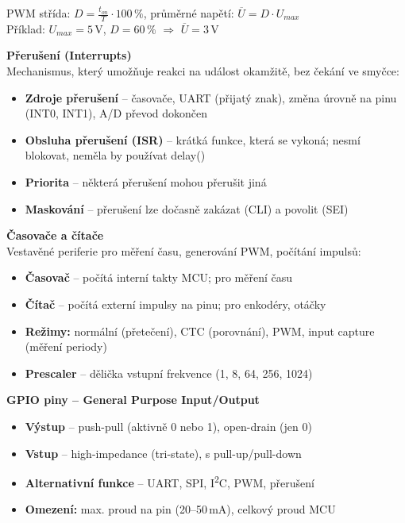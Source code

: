 \documentclass[a4paper,10pt]{article}
\begin{document}
\begin{vysvetlenibox}
\begin{vzorcebox}
PWM střída: $D = \frac{t_{on}}{T} \cdot 100\,\%$, \quad
průměrné napětí: $\overline{U} = D \cdot U_{max}$\\
Příklad: $U_{max}=5\,\text{V}$, $D=60\,\%$ $\Rightarrow$ $\overline{U}=3\,\text{V}$
\end{vzorcebox}

\textbf{Přerušení (Interrupts)}\\
Mechanismus, který umožňuje reakci na událost okamžitě, bez čekání ve smyčce:
\begin{itemize}[noitemsep, leftmargin=1.4em, topsep=4pt]
    \item \textbf{Zdroje přerušení} -- časovače, UART (přijatý znak),
          změna úrovně na pinu (INT0, INT1), A/D převod dokončen
    \item \textbf{Obsluha přerušení (ISR)} -- krátká funkce, která se vykoná;
          nesmí blokovat, neměla by používat delay()
    \item \textbf{Priorita} -- některá přerušení mohou přerušit jiná
    \item \textbf{Maskování} -- přerušení lze dočasně zakázat (CLI) a povolit (SEI)
\end{itemize}

\textbf{Časovače a čítače}\\
Vestavěné periferie pro měření času, generování PWM, počítání impulsů:
\begin{itemize}[noitemsep, leftmargin=1.4em, topsep=4pt]
    \item \textbf{Časovač} -- počítá interní takty MCU; pro měření času
    \item \textbf{Čítač} -- počítá externí impulsy na pinu; pro enkodéry, otáčky
    \item \textbf{Režimy:} normální (přetečení), CTC (porovnání), PWM,
          input capture (měření periody)
    \item \textbf{Prescaler} -- dělička vstupní frekvence (1, 8, 64, 256, 1024)
\end{itemize}

\textbf{GPIO piny -- General Purpose Input/Output}
\begin{itemize}[noitemsep, leftmargin=1.4em, topsep=4pt]
    \item \textbf{Výstup} -- push-pull (aktivně 0 nebo 1), open-drain (jen 0)
    \item \textbf{Vstup} -- high-impedance (tri-state), s pull-up/pull-down
    \item \textbf{Alternativní funkce} -- UART, SPI, I\textsuperscript{2}C, PWM, přerušení
    \item \textbf{Omezení:} max. proud na pin (20--50\,mA), celkový proud MCU
\end{itemize}


\end{vysvetlenibox}
\end{document}
